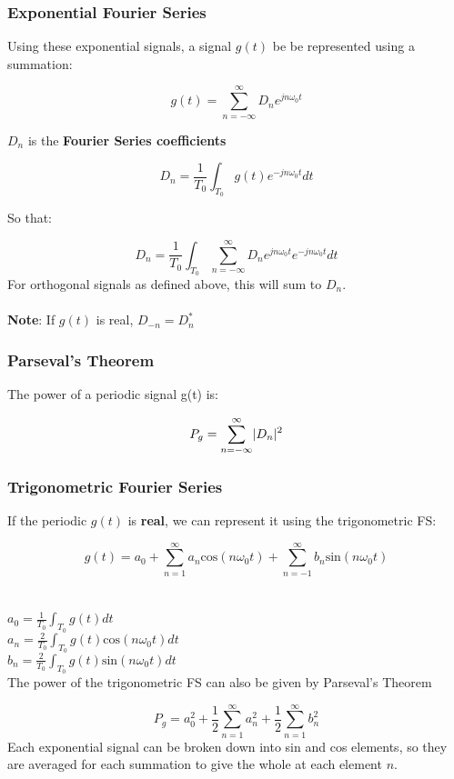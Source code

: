 \documentclass[11pt]{article}
\DeclarePairedDelimiter{\abs}{\lvert}{\rvert}
\begin{document}
\subsubsection{Exponential Fourier Series}
Using these exponential signals, a signal $g(t)$ be be represented using a summation:

$$g(t) = \sum_{n=-\infty}^{\infty}D_ne^{jn\omega_0t}$$

$D_n$ is the \textbf{Fourier Series coefficients}

$$D_n = \frac{1}{T_0}\int_{T_0}g(t)e^{-jn\omega_0t}dt$$

So that:

$$D_n = \frac{1}{T_0}\int_{T_0}\sum_{n=-\infty}^{\infty}D_ne^{jn\omega_0t}e^{-jn\omega_0t}dt$$
\hfill \break
For orthogonal signals as defined above, this will sum to $D_n$.
\\ \\
\textbf{Note}: If $g(t)$ is real, $D_{-n} = D^*_n$
\subsubsection{Parseval's Theorem}

The power of a periodic signal g(t) is:

$$P_g = \sum^\infty_{n=-\infty}\abs{D_n}^2$$
\subsubsection{Trigonometric Fourier Series}
If the periodic $g(t)$ is \textbf{real}, we can represent it using the trigonometric FS:

$$g(t) = a_0 + \sum_{n=1}^{\infty} a_n\text{cos}(n\omega_0t) + \sum_{n=-1}^{\infty} b_n\text{sin}(n\omega_0t)$$\\
\\
$a_0 = \frac{1}{T_0}\int_{T_0}g(t)dt$\\
$a_n = \frac{2}{T_0}\int_{T_0}g(t)\text{cos}(n\omega_0t)dt$\\
$b_n = \frac{2}{T_0}\int_{T_0}g(t)\text{sin}(n\omega_0t)dt$\\

The power of the trigonometric FS can also be given by Parseval's Theorem 

$$P_g = a_0^2 + \frac{1}{2}\sum_{n=1}^{\infty}a^2_n + \frac{1}{2}\sum_{n=1}^{\infty}b^2_n$$
\hfill \break
Each exponential signal can be broken down into sin and cos elements, so they are averaged for each summation to give the whole at each element $n$.
\end{document}
